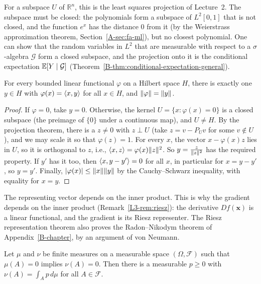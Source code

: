 For a subspace $U$ of $\mathbb{R}^n$, this is the least squares projection of Lecture~2. The subspace must be closed: the polynomials form a subspace of $L^2[0, 1]$ that is not closed, and the function $e^x$ has the distance $0$ from it (by the Weierstrass approximation theorem, Section~\ref{A-sec:fa-ml}), but no closest polynomial. One can show that the random variables in $L^2$ that are measurable with respect to a $\sigma$-algebra $\mathcal{G}$ form a closed subspace, and the projection onto it is the conditional expectation $\mathbb{E}[Y \mid \mathcal{G}]$ (Theorem~\ref{B-thm:conditional-expectation-general}).

\begin{theorem}\label{A-thm:riesz}
    For every bounded linear functional $\varphi$ on a Hilbert space $H$, there is exactly one $y \in H$ with $\varphi(x) = \langle x, y \rangle$ for all $x \in H$, and $\lVert \varphi \rVert = \lVert y \rVert$.
\end{theorem}

\begin{proof}
    If $\varphi = 0$, take $y = 0$. Otherwise, the kernel $U = \{x : \varphi(x) = 0\}$ is a closed subspace (the preimage of $\{0\}$ under a continuous map), and $U \neq H$. By the projection theorem, there is a $z \neq 0$ with $z \perp U$ (take $z = v - P_Uv$ for some $v \notin U$), and we may scale it so that $\varphi(z) = 1$. For every $x$, the vector $x - \varphi(x)z$ lies in $U$, so it is orthogonal to $z$, i.e., $\langle x, z \rangle = \varphi(x)\lVert z \rVert^2$. So $y = \frac{z}{\lVert z \rVert^2}$ has the required property. If $y'$ has it too, then $\langle x, y - y' \rangle = 0$ for all $x$, in particular for $x = y - y'$, so $y = y'$. Finally, $|\varphi(x)| \leq \lVert x \rVert\lVert y \rVert$ by the Cauchy--Schwarz inequality, with equality for $x = y$.
\end{proof}

The representing vector depends on the inner product. This is why the gradient depends on the inner product (Remark~\ref{L3-rem:riesz}): the derivative $Df(\mathbf{x})$ is a linear functional, and the gradient is its Riesz representer. The Riesz representation theorem also proves the Radon--Nikodym theorem of Appendix~\ref{B-chapter}, by an argument of von Neumann.

\begin{theorem}\label{A-thm:radon-nikodym-proof}
    Let $\mu$ and $\nu$ be finite measures on a measurable space $(\Omega, \mathcal{F})$ such that $\mu(A) = 0$ implies $\nu(A) = 0$. Then there is a measurable $p \geq 0$ with $\nu(A) = \int_A p\, d\mu$ for all $A \in \mathcal{F}$.
\end{theorem}

